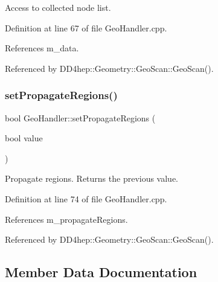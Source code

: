Access to collected node list. 



Definition at line 67 of file Geo\+Handler.\+cpp.



References m\+\_\+data.



Referenced by D\+D4hep\+::\+Geometry\+::\+Geo\+Scan\+::\+Geo\+Scan().

\hypertarget{class_d_d4hep_1_1_geometry_1_1_geo_handler_aeaade3e58229faddb647861b301680e5}{}\label{class_d_d4hep_1_1_geometry_1_1_geo_handler_aeaade3e58229faddb647861b301680e5} 
\subsubsection{\texorpdfstring{set\+Propagate\+Regions()}{setPropagateRegions()}}
{\footnotesize\ttfamily bool Geo\+Handler\+::set\+Propagate\+Regions (\begin{DoxyParamCaption}\item[{bool}]{value }\end{DoxyParamCaption})}



Propagate regions. Returns the previous value. 



Definition at line 74 of file Geo\+Handler.\+cpp.



References m\+\_\+propagate\+Regions.



Referenced by D\+D4hep\+::\+Geometry\+::\+Geo\+Scan\+::\+Geo\+Scan().



\subsection{Member Data Documentation}
\hypertarget{class_d_d4hep_1_1_geometry_1_1_geo_handler_a2ac33960ec9497e7a5f064c3ae0a0747}{}\label{class_d_d4hep_1_1_geometry_1_1_geo_handler_a2ac33960ec9497e7a5f064c3ae0a0747} 

